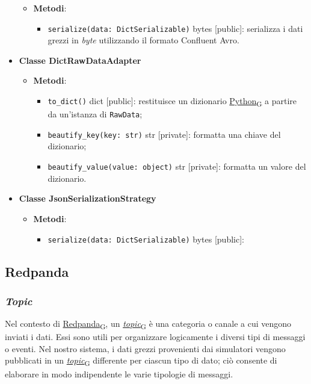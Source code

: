 \begin{itemize}
\begin{itemize}
\begin{itemize}
		            \end{itemize}
		      \item \textbf{Metodi}:
		            \begin{itemize}
			            \item \texttt{serialize(data: DictSerializable)} bytes [public]: serializza i dati grezzi in \textit{byte} utilizzando il formato Confluent Avro.
		            \end{itemize}
	      \end{itemize}
	\item \textbf{Classe DictRawDataAdapter}
	      \begin{itemize}
		      \item \textbf{Metodi}:
		            \begin{itemize}
			            \item \texttt{to\_dict()} dict [public]: restituisce un dizionario \href{https://7last.github.io/docs/pb/documentazione-interna/glossario\#python}{Python\textsubscript{G}} a partire da un'istanza di \texttt{RawData};
			            \item \texttt{beautify\_key(key: str)} str [private]: formatta una chiave del dizionario;
			            \item \texttt{beautify\_value(value: object)} str [private]: formatta un valore del dizionario.
		            \end{itemize}
	      \end{itemize}
	\item \textbf{Classe JsonSerializationStrategy}
	      \begin{itemize}
		      \item \textbf{Metodi}:
		            \begin{itemize}
			            \item \texttt{serialize(data: DictSerializable)} bytes [public]:
		            \end{itemize}
	      \end{itemize}

\end{itemize}

\subsection{Redpanda}
\subsubsection{\textit{Topic}}
Nel contesto di \href{https://7last.github.io/docs/pb/documentazione-interna/glossario\#redpanda}{Redpanda\textsubscript{G}}, un \href{https://7last.github.io/docs/pb/documentazione-interna/glossario\#topic}{\textit{topic}\textsubscript{G}} è una categoria o canale a cui vengono inviati i dati. Essi sono utili per
organizzare logicamente i diversi tipi di messaggi o eventi. Nel nostro sistema, i dati grezzi provenienti dai simulatori vengono pubblicati in un \href{https://7last.github.io/docs/pb/documentazione-interna/glossario\#topic}{\textit{topic}\textsubscript{G}}
differente per ciascun tipo di dato; ciò consente di elaborare in modo indipendente le varie tipologie di messaggi.

